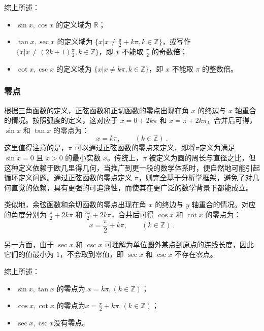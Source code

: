 综上所述：
\begin{itemize}
\item $\sin x,\cos x$ 的定义域为 $\mathbb{R}$；
\item $\tan x,\sec x$ 的定义域为 $\displaystyle\{x|x\neq\frac{\pi}{2}+k\pi,k\in\mathbb{Z}\}$，或写作$\displaystyle\{x|x\neq(2k+1)\frac{\pi}{2},k\in\mathbb{Z}\}$，即 $x$ 不能取 $\displaystyle\frac{\pi}{2}$ 的奇数倍；
\item $\cot x,\csc x$ 的定义域为 $\displaystyle\{x|x\neq k\pi,k\in\mathbb{Z}\}$，即 $x$ 不能取 $\pi$ 的整数倍。
\end{itemize}

\subsubsection{零点}

根据三角函数的定义，正弦函数和正切函数的零点出现在角 $x$ 的终边与 $x$ 轴重合的情况。按照弧度的定义，这对应于 $x = 0+2k\pi$ 和 $x = \pi+2k\pi$，合并后可得， $\sin x$ 和 $\tan x$ 的零点为：
\begin{equation}\label{eq_HsTFFv_1}
x = k\pi, \qquad (k\in\mathbb{Z})~.
\end{equation}
这里值得注意的是，$\pi$ 可以通过正弦函数的零点来定义，即将$\pi$定义为满足 $\sin x = 0$ 且 $x > 0$ 的最小实数 $x$。传统上，$\pi$ 被定义为圆的周长与直径之比，但这种定义依赖于欧几里得几何，当推广到更一般的数学体系时，便自然地可能引起循环定义问题。通过正弦函数的零点定义 $\pi$，则完全基于分析学框架，避免了对几何直觉的依赖，具有更强的可追溯性，而使其在更广泛的数学背景下都能成立。

类似地，余弦函数和余切函数的零点出现在角 $x$ 的终边与 $y$ 轴重合的情况。对应的角度分别为 $\displaystyle{\frac{\pi}{2}} + 2k\pi$ 和 $\displaystyle{\frac{3\pi}{2}} + 2k\pi$，合并后可得 $\cos x$ 和 $\cot x$ 的零点为：
\begin{equation}
x = \frac{\pi}{2} + k\pi, \qquad (k\in\mathbb{Z})~.
\end{equation}

另一方面，由于 $\sec x$ 和 $\csc x$ 可理解为单位圆外某点到原点的连线长度，因此它们的值最小为 $1$，不会取到零值，即 $\sec x$ 和 $\csc x$ 不存在零点。

综上所述：
\begin{itemize}
\item $\sin x, \tan x$ 的零点为 $x = k\pi, (k\in\mathbb{Z})$；
\item $\cos x, \cot x$ 的零点为$\displaystyle x = \frac{\pi}{2} + k\pi, (k\in\mathbb{Z})$；
\item $\sec x, \csc x$没有零点。
\end{itemize}

